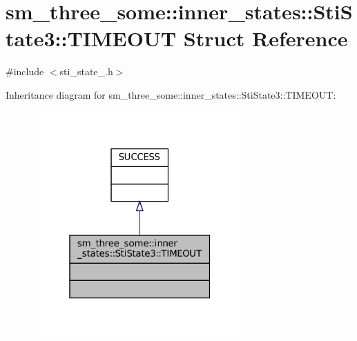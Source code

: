 \hypertarget{structsm__three__some_1_1inner__states_1_1StiState3_1_1TIMEOUT}{}\section{sm\+\_\+three\+\_\+some\+:\+:inner\+\_\+states\+:\+:Sti\+State3\+:\+:T\+I\+M\+E\+O\+UT Struct Reference}
\label{structsm__three__some_1_1inner__states_1_1StiState3_1_1TIMEOUT}


{\ttfamily \#include $<$sti\+\_\+state\+\_.\+h$>$}



Inheritance diagram for sm\+\_\+three\+\_\+some\+:\+:inner\+\_\+states\+:\+:Sti\+State3\+:\+:T\+I\+M\+E\+O\+UT\+:
\nopagebreak
\begin{figure}[H]
\begin{center}
\leavevmode
\includegraphics[width=232pt]{structsm__three__some_1_1inner__states_1_1StiState3_1_1TIMEOUT__inherit__graph}
\end{center}
\end{figure}


